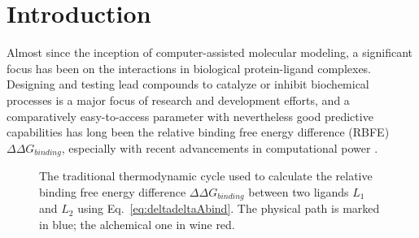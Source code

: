 \documentclass[oneside]{scrreprt}
\begin{document}
\begingroup
\let\clearpage\relax
\renewcommand\contentsname{Table of Contents}
\tableofcontents
\endgroup
\chapter{Introduction}
Almost since the inception of computer-assisted molecular modeling, a significant focus has been on the interactions in biological protein-ligand complexes. Designing and testing lead compounds to catalyze or inhibit biochemical processes is a major focus of research and development efforts, and a comparatively easy-to-access parameter with nevertheless good predictive capabilities has long been the relative binding free energy difference (RBFE) $\Delta\Delta G_{binding}$, especially with recent advancements in computational power \cite{cournia_relative_2017}.

\begin{figure}[H]
   
    
    

  \begin{center}

    
    \caption[Traditional thermodynamic cycle for RBFE differences]{The traditional thermodynamic cycle\cite{klimovich_guidelines_2015} used to calculate the relative binding free energy difference $\Delta\Delta G_{binding}$ between two ligands $L_1$ and $L_2$ using Eq.~\ref{eq:deltadeltaAbind}. The physical path is marked in blue; the alchemical one in wine red.} 
    \label{fig:thermocycle_rbfe}
  \end{center}
\end{figure}
\end{document}

